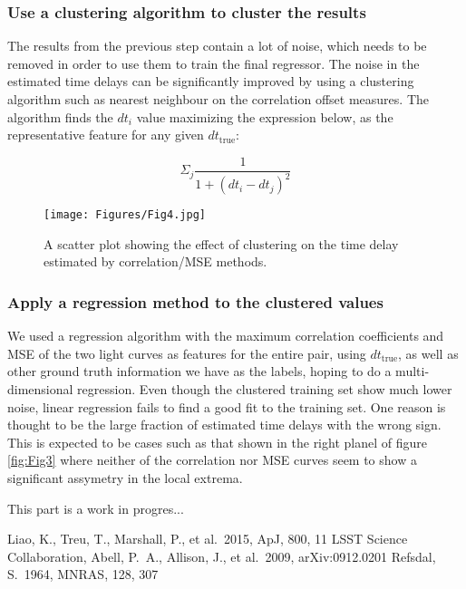 \documentclass[a4paper, 11pt]{article}
\begin{document}
\subsubsection{Use a clustering algorithm to cluster the results}
The results from the previous step contain a lot of noise, which needs to be removed in order to use them to train the final regressor. The noise in the estimated time delays can be significantly improved by using a clustering algorithm such as nearest neighbour on the correlation offset measures. The algorithm finds the $dt_i$ value maximizing the expression below, as the representative feature for any given $dt_\mathrm{true}$:

\begin{equation}
\Sigma_{j}\frac{1}{1 + (dt_i - dt_j)^2}
\end{equation}

\begin{figure}
\centering
\texttt{[image: Figures/Fig4.jpg]}
\caption{A scatter plot showing the effect of clustering on the time delay estimated by correlation/MSE methods.}%
\label{fig:Fig4}
\end{figure}

\subsubsection{Apply a regression method to the clustered values}
We used a regression algorithm with the maximum correlation coefficients and MSE of the two light curves as features for the entire pair, using $dt_\mathrm{true}$, as well as other ground truth information we have
as the labels, hoping to do a multi-dimensional regression. Even though the clustered training set show much lower noise, linear regression fails to find a good fit to the training set. One reason is thought to be the large fraction of estimated time delays with the wrong sign. This is expected to be cases such as that shown in the right planel of figure \ref{fig:Fig3} where neither of the correlation nor MSE curves seem to show a significant assymetry in the local extrema.

This part is a work in progres...

\newpage
\begin{thebibliography}{}
 Liao, K., Treu, T., Marshall, P., et al.\ 2015, ApJ, 800, 11 
 LSST Science Collaboration, Abell, P.~A., Allison, J., et al.\ 2009, arXiv:0912.0201 Refsdal, S.\ 1964, MNRAS, 128, 307
\end{thebibliography}
\end{document}
